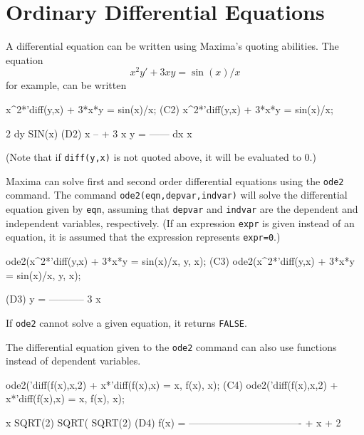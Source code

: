 \documentclass{article}
\begin{document}
\section{Ordinary Differential Equations}

A differential equation can be written using Maxima's quoting abilities.
The equation
$$ x^2y'+3xy=\sin(x)/x$$
for example, can be written

\beginmaximasession
x^2*'diff(y,x) + 3*x*y = sin(x)/x;
\maximasession
(C2) x^2*'diff(y,x) + 3*x*y = sin(x)/x;


                             2 dy           SIN(x)
(D2)                        x  -- + 3 x y = ------
                               dx             x
\endmaximasession

\noindent
(Note that if \texttt{diff(y,x)} is not quoted above, it will be
evaluated to 0.)

Maxima can solve first and second order differential equations using
the \texttt{ode2} command.  The command
\texttt{ode2(eqn,depvar,indvar)} will solve the differential equation
given by \texttt{eqn}, assuming that \texttt{depvar} and
\texttt{indvar} are the dependent and independent variables,
respectively.  (If an expression \texttt{expr} is given instead of an
equation, it is assumed that the expression represents
\texttt{expr=0}.)

\beginmaximasession
ode2(x^2*'diff(y,x) + 3*x*y = sin(x)/x, y, x);
\maximasession
(C3) ode2(x^2*'diff(y,x) + 3*x*y = sin(x)/x, y, x);


(D3)                            y = -----------
                                         3
                                        x
\endmaximasession

\noindent
If \texttt{ode2} cannot solve a given equation, it returns
\texttt{FALSE}.

The differential equation given to the \texttt{ode2} command can also
use functions instead of dependent variables.

\beginmaximasession
ode2('diff(f(x),x,2) + x*'diff(f(x),x) = x, f(x), x);
\maximasession
(C4) ode2('diff(f(x),x,2) + x*'diff(f(x),x) = x, f(x), x);


                                                  x
                     SQRT(2) SQRT(%
                                               SQRT(2)
(D4)          f(x) = ---------------------------------- + x + %
                                     2
\endmaximasession
\end{document}
